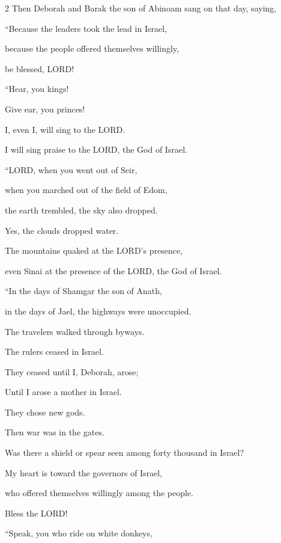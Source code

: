 \mychapter{} 
\begin{multicols}{2}
\myverse*{}Then Deborah and Barak the son of Abinoam sang on that day, saying,

\myverse{}“Because the leaders took the lead in Israel,

because the people offered themselves willingly,

be blessed, LORD!


\vspace{\baselineskip} \myverse{}“Hear, you kings!

Give ear, you princes!

I, even I, will sing to the LORD.

I will sing praise to the LORD, the God of Israel.


\vspace{\baselineskip} \myverse{}“LORD, when you went out of Seir,

when you marched out of the field of Edom,

the earth trembled, the sky also dropped.

Yes, the clouds dropped water.

\myverse{}The mountains quaked at the LORD’s presence,

even Sinai at the presence of the LORD, the God of Israel.


\vspace{\baselineskip} \myverse{}“In the days of Shamgar the son of Anath,

in the days of Jael, the highways were unoccupied.

The travelers walked through byways.

\myverse{}The rulers ceased in Israel.

They ceased until I, Deborah, arose;

Until I arose a mother in Israel.

\myverse{}They chose new gods.

Then war was in the gates.

Was there a shield or spear seen among forty thousand in Israel?

\myverse{}My heart is toward the governors of Israel,

who offered themselves willingly among the people.

Bless the LORD!


\vspace{\baselineskip} \myverse{}“Speak, you who ride on white donkeys,


\end{multicols}
